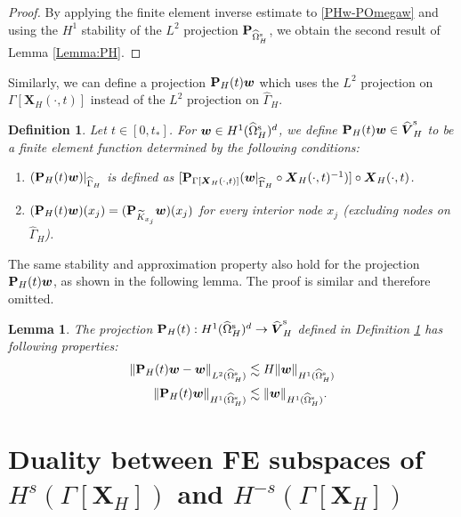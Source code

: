 \documentclass[11pt,reqno]{amsart}
\theoremstyle{definition}
\theoremstyle{plain}
\newtheorem{lemma}{Lemma}[section]
\newtheorem{definition}{Definition}[section]
\numberwithin{theorem}{section}
\numberwithin{proposition}{section}
\numberwithin{lemma}{section}
\numberwithin{equation}{section}
\newcommand{\bs}[1]{\boldsymbol{#1}}
\renewcommand{\(}{\bigl(}
\renewcommand{\)}{\bigr)}
\begin{document}
\begin{proof}
By applying the finite element inverse estimate to \eqref{PHw-POmegaw} and using the $H^1$ stability of the $L^2$ projection ${\bf P}_{\widehat\Omega^{\rm s}_H}$, we obtain the second result of Lemma \ref{Lemma:PH}. 
\end{proof}

Similarly, we can define a projection ${\bf P}_H(t){\bs w}$ which uses the $L^2$ projection on $\Gamma[{\bs X}_H(\cdot,t)]$ instead of the $L^2$ projection on $\widehat\Gamma_H$. 

\begin{definition}\label{L2-L2-proj2}
Let $t\in[0,t_*]$. For ${\bs w}\in H^1(\widehat\Omega^{\rm s}_H)^d$, we define ${\bf P}_H(t){\bs w}\in \widehat{\bs V}^{\rm s}_H$ to be a finite element function determined by the following conditions: 
\begin{enumerate}
\item 
$({\bf P}_H(t){\bs w})|_{\widehat\Gamma_H}$ is defined as $[{\bf P}_{\Gamma[{\bs X}_H(\cdot,t)]}({\bs w}|_{\widehat\Gamma_H}\circ{\bs X}_H(\cdot,t)^{-1})]\circ{\bs X}_H(\cdot,t)$. 

\item 
$({\bf P}_H(t){\bs w})(x_j)=({\bf P}_{\widetilde K_{x_j}}{\bs w})(x_j)$ for every interior node $x_j$ {\rm(}excluding nodes on $\widehat\Gamma_H${\rm)}.
\end{enumerate}
\end{definition}

The same stability and approximation property also hold for the projection ${\bf P}_H(t){\bs w}$, as shown in the following lemma. The proof is similar and therefore omitted. 
\begin{lemma}\label{Lemma:PH2}
The projection ${\bf P}_H(t):H^1(\widehat\Omega^{\rm s}_H)^d\rightarrow \widehat{\bs V}^{\rm s}_H$ defined in Definition \ref{L2-L2-proj2} has following properties: 
\begin{align*}
\|{\bf P}_H(t){\bs w} - {\bs w}\|_{L^2(\widehat\Omega^{\rm s}_H)}
&\lesssim H\|{\bs w}\|_{H^1(\widehat\Omega^{\rm s}_H)} \\
\|{\bf P}_H(t){\bs w}\|_{H^1(\widehat\Omega^{\rm s}_H)}
&\lesssim \|{\bs w}\|_{H^1(\widehat\Omega^{\rm s}_H)} .
\end{align*}
\end{lemma}


\section{Duality between FE subspaces of \texorpdfstring{$H^s(\Gamma[{\bs X}_H])$}{x} and \texorpdfstring{$H^{-s}(\Gamma[{\bs X}_H])$}{x}}
\label{appendix:duality}
\end{document}
